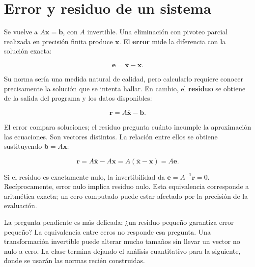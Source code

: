 \documentclass[12pt,a4paper]{article}
\begin{document}
\section{Error y residuo de un sistema}

Se vuelve a $A\mathbf x=\mathbf b$, con $A$ invertible. Una eliminación con pivoteo parcial realizada en precisión finita produce $\overline{\mathbf x}$. El \textbf{error} mide la diferencia con la solución exacta:

\[
\mathbf e=\overline{\mathbf x}-\mathbf x.
\]

Su norma sería una medida natural de calidad, pero calcularlo requiere conocer precisamente la solución que se intenta hallar. En cambio, el \textbf{residuo} se obtiene de la salida del programa y los datos disponibles:

\[
\mathbf r=A\overline{\mathbf x}-\mathbf b.
\]

El error compara soluciones; el residuo pregunta cuánto incumple la aproximación las ecuaciones. Son vectores distintos. La relación entre ellos se obtiene sustituyendo $\mathbf b=A\mathbf x$:

\[
\boxed{\mathbf r=A\overline{\mathbf x}-A\mathbf x
=A(\overline{\mathbf x}-\mathbf x)=A\mathbf e}.
\]

Si el residuo es exactamente nulo, la invertibilidad da $\mathbf e=A^{-1}\mathbf r=0$. Recíprocamente, error nulo implica residuo nulo. Esta equivalencia corresponde a aritmética exacta; un cero computado puede estar afectado por la precisión de la evaluación.

La pregunta pendiente es más delicada: ¿un residuo pequeño garantiza error pequeño? La equivalencia entre ceros no responde esa pregunta. Una transformación invertible puede alterar mucho tamaños sin llevar un vector no nulo a cero. La clase termina dejando el análisis cuantitativo para la siguiente, donde se usarán las normas recién construidas.
\end{document}
